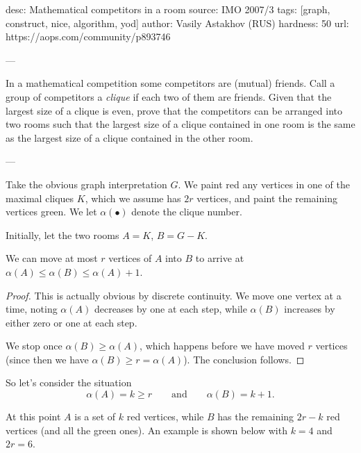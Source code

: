 desc:  Mathematical competitors in a room
source:  IMO 2007/3
tags:  [graph, construct, nice, algorithm, yod]
author: Vasily Astakhov (RUS)
hardness: 50
url: https://aops.com/community/p893746

---

In a mathematical competition some competitors are (mutual) friends.
Call a group of competitors a \emph{clique} if each two of them are friends.
Given that the largest size of a clique is even,
prove that the competitors can be arranged into two rooms
such that the largest size of a clique contained in one room
is the same as the largest size of a clique contained in the other room.

---

Take the obvious graph interpretation $G$.
We paint red any vertices in one of the maximal cliques $K$,
which we assume has $2r$ vertices,
and paint the remaining vertices green.
We let $\alpha(\bullet)$ denote the clique number.

Initially, let the two rooms $A = K$, $B = G-K$.
\begin{claim*}
  We can move at most $r$ vertices of $A$ into $B$
  to arrive at $\alpha(A) \le \alpha(B) \le \alpha(A)+1$.
\end{claim*}
\begin{proof}
  This is actually obvious by discrete continuity.
  We move one vertex at a time,
  noting $\alpha(A)$ decreases by one at each step,
  while $\alpha(B)$ increases by either zero or one at each step.

  We stop once $\alpha(B) \ge \alpha(A)$,
  which happens before we have moved $r$ vertices
  (since then we have $\alpha(B) \ge r = \alpha(A)$).
  The conclusion follows.
\end{proof}

So let's consider the situation
\[ \alpha(A) = k \ge r \qquad\text{and}\qquad \alpha(B) = k+1. \]

At this point $A$ is a set of $k$ red vertices,
while $B$ has the remaining $2r-k$ red vertices
(and all the green ones).
An example is shown below with $k=4$ and $2r = 6$.

